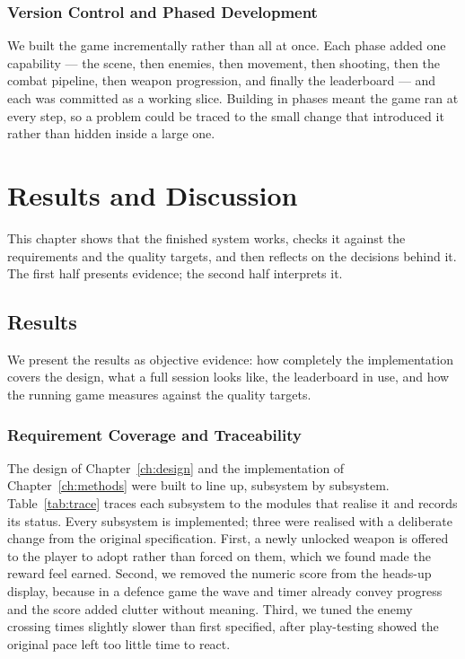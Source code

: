 \documentclass[12pt,a4paper]{report}
\begin{document}
\subsection{Version Control and Phased Development}

We built the game incrementally rather than all at once. Each phase added one
capability --- the scene, then enemies, then movement, then shooting, then the
combat pipeline, then weapon progression, and finally the leaderboard --- and
each was committed as a working slice. Building in phases meant the game ran at
every step, so a problem could be traced to the small change that introduced it
rather than hidden inside a large one.

\chapter{Results and Discussion}\label{ch:results}

This chapter shows that the finished system works, checks it against the
requirements and the quality targets, and then reflects on the decisions behind
it. The first half presents evidence; the second half interprets it.

\section{Results}

We present the results as objective evidence: how completely the implementation
covers the design, what a full session looks like, the leaderboard in use, and
how the running game measures against the quality targets.

\subsection{Requirement Coverage and Traceability}

The design of Chapter~\ref{ch:design} and the implementation of
Chapter~\ref{ch:methods} were built to line up, subsystem by subsystem.
Table~\ref{tab:trace} traces each subsystem to the modules that realise it and
records its status. Every subsystem is implemented; three were realised with a
deliberate change from the original specification. First, a newly unlocked
weapon is offered to the player to adopt rather than forced on them, which we
found made the reward feel earned. Second, we removed the numeric score from the
heads-up display, because in a defence game the wave and timer already convey
progress and the score added clutter without meaning. Third, we tuned the enemy
crossing times slightly slower than first specified, after play-testing showed
the original pace left too little time to react.
\end{document}
